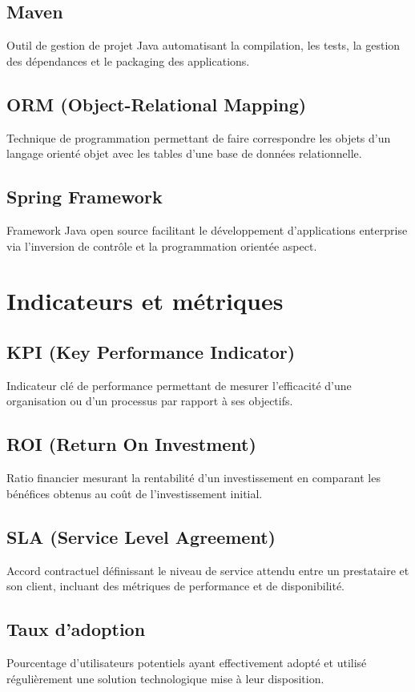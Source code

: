 \subsection{Maven}
Outil de gestion de projet Java automatisant la compilation, les tests, la gestion des dépendances et le packaging des applications.

\subsection{ORM (Object-Relational Mapping)}
Technique de programmation permettant de faire correspondre les objets d'un langage orienté objet avec les tables d'une base de données relationnelle.

\subsection{Spring Framework}
Framework Java open source facilitant le développement d'applications enterprise via l'inversion de contrôle et la programmation orientée aspect.

\section{Indicateurs et métriques}

\subsection{KPI (Key Performance Indicator)}
Indicateur clé de performance permettant de mesurer l'efficacité d'une organisation ou d'un processus par rapport à ses objectifs.

\subsection{ROI (Return On Investment)}
Ratio financier mesurant la rentabilité d'un investissement en comparant les bénéfices obtenus au coût de l'investissement initial.

\subsection{SLA (Service Level Agreement)}
Accord contractuel définissant le niveau de service attendu entre un prestataire et son client, incluant des métriques de performance et de disponibilité.

\subsection{Taux d'adoption}
Pourcentage d'utilisateurs potentiels ayant effectivement adopté et utilisé régulièrement une solution technologique mise à leur disposition.

